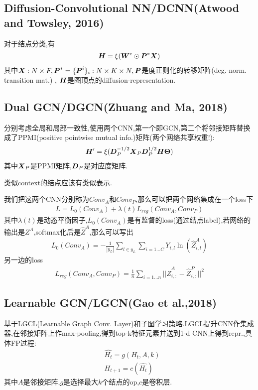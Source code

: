\documentclass{article}
\begin{document}
\subsection{Diffusion-Convolutional NN/DCNN(Atwood and Towsley, 2016)}

 对于结点分类,有
\begin{align}
    \boldsymbol{H}=\xi(\boldsymbol{W}^c \odot \boldsymbol{P}^* \boldsymbol{X})
\end{align}
其中$\boldsymbol{X}:N\times F, \boldsymbol{P}^*=\{\boldsymbol{P}^{i}\}_i:N\times K \times N,\boldsymbol{P}$是度正则化的转移矩阵(deg.-norm. transition mat.) , $\boldsymbol{H}$是图顶点的diffusion-representation.

\subsection{Dual GCN/DGCN(Zhuang and Ma, 2018)}

 分别考虑全局和局部一致性,使用两个CNN,第一个即GCN,第二个将邻接矩阵替换成了PPMI(positive pointwise mutual info.)矩阵(两个网络共享权重!):
\begin{align}
    \boldsymbol{H}'=\xi(\boldsymbol{D}_P^{-1/2} \boldsymbol{X}_P \boldsymbol{D}_P^{1/2}\boldsymbol{H} \boldsymbol{\Theta})
\end{align}
其中$\boldsymbol{X}_P$是PPMI矩阵,$\boldsymbol{D}_P$是对应度矩阵.

 类似context的结点应该有类似表示.

我们把这两个CNN分别称为$Conv_A$和$Conv_P$,那么可以把两个网络集成在一个loss下
\begin{align}
    L=L_0(Conv_A)+\lambda(t) L_{reg}(Conv_A,Conv_P)
\end{align}其中$\lambda(t)$是动态平衡因子,$L_0(Conv_A)$是有监督的loss(通过结点label),若网络的输出是$Z^A$,softmax化后是$\widehat Z^A$,那么可以写出
\begin{align}
    L_0(Conv_A)=-\frac{1}{|y_L|}\sum_{l\in y_L}\sum_{i=1\dots C} Y_{i,l}\ln\left(\widehat Z^A_{i,l}\right)
\end{align}
另一边的loss
\begin{align}
    L_{reg}(Conv_A,Conv_P)=\frac{1}{n}\sum_{i=1\dots n}||\widehat Z^A_{i,:}-\widehat Z^P_{i,:}||^2
\end{align}

\subsection{Learnable GCN/LGCN(Gao et al.,2018)}

 基于LGCL(Learnable Graph Conv. Layer)和子图学习策略.LGCL提升CNN作集成器,在邻接矩阵上作max-pooling,得到top-k特征元素并送到1-d CNN上得到repr.,具体FP过程:
\begin{align}
    &\widehat{H_t}=g(H_t,A,k)\\
    &{H_{t+1}}=c(\widehat{H_t})
\end{align}
其中$A$是邻接矩阵,$g$是选择最大$k$个结点的op,$c$是卷积层.
\end{document}

